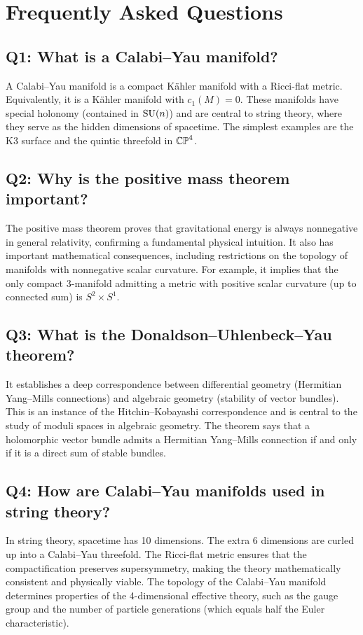 \section{Frequently Asked Questions}

\subsection*{Q1: What is a Calabi--Yau manifold?}
A Calabi--Yau manifold is a compact K\"ahler manifold with a Ricci-flat metric. Equivalently, it is a K\"ahler manifold with $c_1(M) = 0$. These manifolds have special holonomy (contained in $\operatorname{SU}(n)$) and are central to string theory, where they serve as the hidden dimensions of spacetime. The simplest examples are the K3 surface and the quintic threefold in $\mathbb{CP}^4$.

\subsection*{Q2: Why is the positive mass theorem important?}
The positive mass theorem proves that gravitational energy is always nonnegative in general relativity, confirming a fundamental physical intuition. It also has important mathematical consequences, including restrictions on the topology of manifolds with nonnegative scalar curvature. For example, it implies that the only compact 3-manifold admitting a metric with positive scalar curvature (up to connected sum) is $S^2 \times S^1$.

\subsection*{Q3: What is the Donaldson--Uhlenbeck--Yau theorem?}
It establishes a deep correspondence between differential geometry (Hermitian Yang--Mills connections) and algebraic geometry (stability of vector bundles). This is an instance of the Hitchin--Kobayashi correspondence and is central to the study of moduli spaces in algebraic geometry. The theorem says that a holomorphic vector bundle admits a Hermitian Yang--Mills connection if and only if it is a direct sum of stable bundles.

\subsection*{Q4: How are Calabi--Yau manifolds used in string theory?}
In string theory, spacetime has 10 dimensions. The extra 6 dimensions are curled up into a Calabi--Yau threefold. The Ricci-flat metric ensures that the compactification preserves supersymmetry, making the theory mathematically consistent and physically viable. The topology of the Calabi--Yau manifold determines properties of the 4-dimensional effective theory, such as the gauge group and the number of particle generations (which equals half the Euler characteristic).

